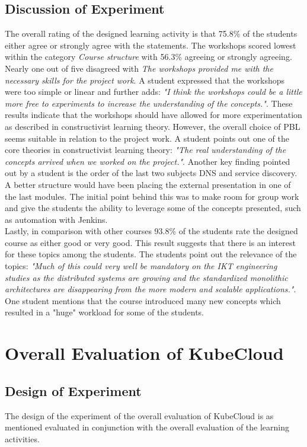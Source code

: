 \subsection*{Discussion of Experiment}
The overall rating of the designed learning activity is that 75.8\% of the students either agree or strongly agree with the statements. The workshops scored lowest within the category \textit{Course structure} with 56.3\% agreeing or strongly agreeing. Nearly one out of five disagreed with \textit{The workshops provided me with the necessary skills for the project work}. A student expressed that the workshops were too simple or linear and further adds: \textit{"I think the workshops could be a little more free to experiments to increase the understanding of the concepts."}. These results indicate that the workshops should have allowed for more experimentation as described in constructivist learning theory. However, the overall choice of PBL seems suitable in relation to the project work. A student points out one of the core theories in constructivist learning theory: \textit{"The real understanding of the concepts arrived when we worked on the project."}. Another key finding  pointed out by a student is the order of the last two subjects DNS and service discovery. A better structure would have been placing the external presentation in one of the last modules. The initial point behind this was to make room for group work and give the students the ability to leverage some of the concepts presented, such as automation with Jenkins.\\

\noindent
Lastly, in comparison with other courses 93.8\% of the students rate the designed course as either good or very good. This result suggests that there is an interest for these topics among the students. The students point out the relevance of the topics: \textit{"Much of this could very well be mandatory on the IKT engineering studies as the distributed systems are growing and the standardized monolithic architectures are disappearing from the more modern and scalable applications."}. One student mentions that the course introduced many new concepts which resulted in a "huge" workload for some of the students.

\section{Overall Evaluation of KubeCloud}

\subsection*{Design of Experiment}
The design of the experiment of the overall evaluation of KubeCloud is as mentioned evaluated in conjunction with the overall evaluation of the learning activities.\\

